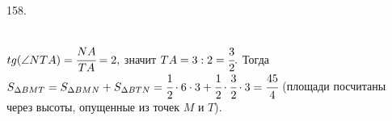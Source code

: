 158. \begin{figure}[ht!]
\end{figure}\\
$tg(\angle NTA)=\cfrac{NA}{TA}=2,$ значит $TA=3:2=\cfrac{3}{2}.$ Тогда $S_{\Delta BMT}=S_{\Delta BMN}+S_{\Delta BTN}=\cfrac{1}{2}\cdot6\cdot3+\cfrac{1}{2}\cdot\cfrac{3}{2}\cdot3=\cfrac{45}{4}$ (площади посчитаны через высоты, опущенные из точек $M$ и $T$).\\
